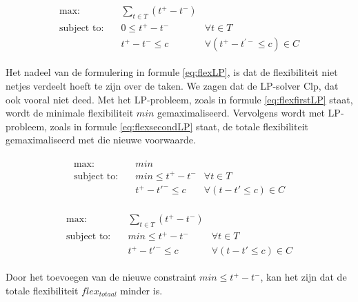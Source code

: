 \begin{align}
\label{eq:flexLP}
\begin{aligned}
        \text{max:}& \quad \sum_{t \in T} (t^+ - t^-) & \\
 \text{subject to:}& \quad 0 \leq t^+ - t^- & \forall t \in T \\
                   & \quad t^+ - t^- \leq c & \forall (t^+ - t^{'-} \leq c) \in C
\end{aligned}
\end{align}

Het nadeel van de formulering in formule \ref{eq:flexLP}, is dat de flexibiliteit  niet netjes verdeelt hoeft te zijn over de taken. We zagen dat de LP-solver Clp, dat ook vooral niet deed. Met het LP-probleem, zoals in formule \ref{eq:flexfirstLP} staat, wordt de minimale flexibiliteit $min$ gemaximaliseerd. Vervolgens wordt met LP-probleem, zoals in formule \ref{eq:flexsecondLP} staat, de totale flexibiliteit gemaximaliseerd met die nieuwe voorwaarde. 

\begin{align}
\label{eq:flexfirstLP}
\begin{aligned}
        \text{max:}& \quad min & \\
 \text{subject to:}& \quad min \leq t^+ - t^- & \forall t \in T \\
                   & \quad t^+ - t'^- \leq c & \forall (t - t' \leq c) \in C
\end{aligned}
\end{align}

\begin{align}
\label{eq:flexsecondLP}
\begin{aligned}
        \text{max:}& \quad \sum_{t \in T} (t^+ - t^-) & \\
 \text{subject to:}& \quad min \leq t^+ - t^- & \forall t \in T \\
                   & \quad t^+ - t'^- \leq c & \forall (t - t' \leq c) \in C
\end{aligned}
\end{align}

Door het toevoegen van de nieuwe constraint $min \leq t^+ - t^-$, kan het zijn dat de totale flexibiliteit $flex_{totaal}$ minder is.
